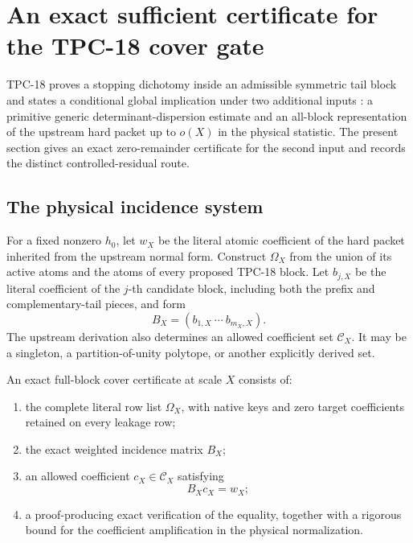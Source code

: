\section{An exact sufficient certificate for the TPC-18 cover gate}
\label{sec:tpc18-crosswalk}

TPC-18 proves a stopping dichotomy inside an admissible symmetric tail
block and states a conditional global implication under two additional
inputs \citep{WangTPC18}: a primitive generic determinant-dispersion
estimate and an all-block representation of the upstream hard packet
up to \(o(X)\) in the physical statistic.  The present section gives
an exact zero-remainder certificate for the second input and records
the distinct controlled-residual route.

\subsection{The physical incidence system}

For a fixed nonzero \(h_0\), let \(w_X\) be the literal atomic
coefficient of the hard packet inherited from the upstream normal
form.  Construct \(\Omega_X\) from the union of its active atoms and
the atoms of every proposed TPC-18 block.  Let \(b_{j,X}\) be the
literal coefficient of the \(j\)-th candidate block, including both
the prefix and complementary-tail pieces, and form
\[
 B_X=(b_{1,X}\ \cdots\ b_{m_X,X}).
\]
The upstream derivation also determines an allowed coefficient set
\(\mathscr C_X\).  It may be a singleton, a partition-of-unity
polytope, or another explicitly derived set.

\begin{definition}
\label{def:tpc18-certificate}
An exact full-block cover certificate at scale \(X\) consists of:
\begin{enumerate}[label=(\roman*),leftmargin=2.2em]
\item the complete literal row list \(\Omega_X\), with native keys and
  zero target coefficients retained on every leakage row;
\item the exact weighted incidence matrix \(B_X\);
\item an allowed coefficient \(c_X\in\mathscr C_X\) satisfying
  \[
  B_Xc_X=w_X;
  \]
\item a proof-producing exact verification of the equality, together
  with a rigorous bound for the coefficient amplification in the
  physical normalization.
\end{enumerate}
\end{definition}

